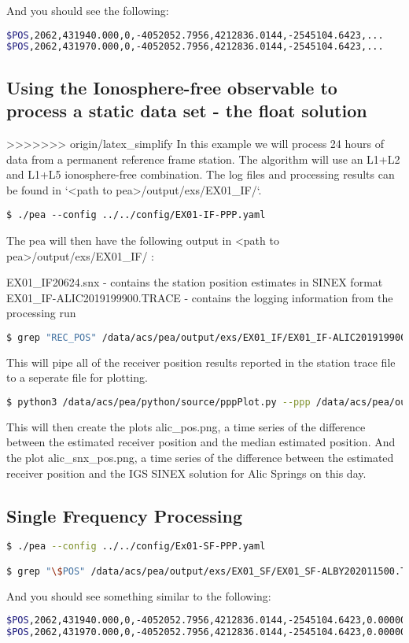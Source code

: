 And you should see the following: 
\begin{lstlisting}[language=bash] 
$POS,2062,431940.000,0,-4052052.7956,4212836.0144,-2545104.6423,...
$POS,2062,431970.000,0,-4052052.7956,4212836.0144,-2545104.6423,...
\end{lstlisting}


\subsection{Using the Ionosphere-free observable to process a static data set - the float solution}

>>>>>>> origin/latex_simplify
In this example we will process 24 hours of data from a permanent reference frame station. The algorithm will use an L1+L2 and L1+L5 ionosphere-free combination.
The log files and processing results can be found in `<path to pea>/output/exs/EX01\_IF/`.
\begin{lstlisting}
$ ./pea --config ../../config/EX01-IF-PPP.yaml
\end{lstlisting}
The pea will then have the following output in <path to pea>/output/exs/EX01\_IF/ :

EX01\_IF20624.snx              - contains the station position estimates in SINEX format
EX01\_IF-ALIC2019199900.TRACE  - contains the logging information from the processing run

\begin{lstlisting}[language=bash]
$ grep "REC_POS" /data/acs/pea/output/exs/EX01_IF/EX01_IF-ALIC201919900.TRACE > ALIC_201919900.PPP
\end{lstlisting}
This will pipe all of the receiver position results reported in the station trace file to a seperate file for plotting.
\begin{lstlisting}[language=bash]
$ python3 /data/acs/pea/python/source/pppPlot.py --ppp /data/acs/pea/output/exs/EX01_IF/ALIC_201919900.PPP
\end{lstlisting}
This will then create the plots alic\_pos.png, a time series of the difference between the estimated receiver position and the median estimated position.
And the plot alic\_snx\_pos.png, a time series of the difference between the estimated receiver position and the IGS SINEX solution for Alic Springs on this day.

\subsection{Single Frequency Processing} 
\begin{lstlisting}[language=bash]
$ ./pea --config ../../config/Ex01-SF-PPP.yaml

$ grep "\$POS" /data/acs/pea/output/exs/EX01_SF/EX01_SF-ALBY202011500.TRACE
\end{lstlisting}
And you should see something similar to the following:
\begin{lstlisting}[language=bash]
$POS,2062,431940.000,0,-4052052.7956,4212836.0144,-2545104.6423,0.00000043966020,...
$POS,2062,431970.000,0,-4052052.7956,4212836.0144,-2545104.6423,0.00000043965772,...
\end{lstlisting}



